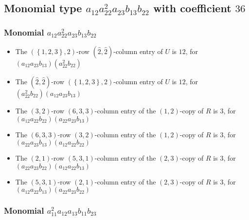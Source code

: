 \documentclass{article}
\begin{document}
\subsection{Monomial type $ a_{12} a_{22}^{2} a_{23} b_{13} b_{22} $ with coefficient $ 36 $}

\subsubsection{Monomial $ a_{12} a_{22}^{2} a_{23} b_{13} b_{22} $}

\begin{itemize}
\item The $ \left(\left\{1, 2, 3\right\}, 2\right) $-row $ (\hat{2}, \hat{2}) $-column entry of $U$ is $ 12 $, for $( a_{12} a_{23} b_{13} )( a_{22}^{2} b_{22} )$ 
\item The $(\hat{2}, \hat{2})$-row $ \left(\left\{1, 2, 3\right\}, 2\right) $-column entry of $U$ is $ 12 $, for $( a_{22}^{2} b_{22} )( a_{12} a_{23} b_{13} )$ 
\item The $(3, 2)$-row $(6, 3, 3)$-column entry of the $ \left(1, 2\right) $-copy of $R$ is $ 3 $, for $( a_{12} a_{22} b_{22} )( a_{22} a_{23} b_{13} )$ 
\item The $(6, 3, 3)$-row $(3, 2)$-column entry of the $ \left(1, 2\right) $-copy of $R$ is $ 3 $, for $( a_{22} a_{23} b_{13} )( a_{12} a_{22} b_{22} )$ 
\item The $(2, 1)$-row $(5, 3, 1)$-column entry of the $ \left(2, 3\right) $-copy of $R$ is $ 3 $, for $( a_{22} a_{23} b_{22} )( a_{12} a_{22} b_{13} )$ 
\item The $(5, 3, 1)$-row $(2, 1)$-column entry of the $ \left(2, 3\right) $-copy of $R$ is $ 3 $, for $( a_{12} a_{22} b_{13} )( a_{22} a_{23} b_{22} )$ 
\end{itemize}
\subsubsection{Monomial $ a_{11}^{2} a_{12} a_{13} b_{11} b_{23} $}
\end{document}

